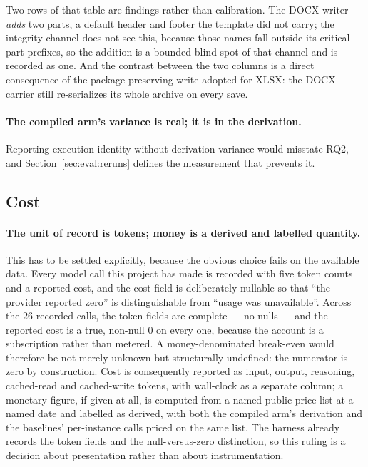Two rows of that table are findings rather than calibration. The DOCX writer \emph{adds} two
parts, a default header and footer the template did not carry; the integrity channel does not
see this, because those names fall outside its critical-part prefixes, so the addition is a
bounded blind spot of that channel and is recorded as one. And the contrast between the two
columns is a direct consequence of the package-preserving write adopted for XLSX: the DOCX
carrier still re-serializes its whole archive on every save.

\paragraph{The compiled arm's variance is real; it is in the derivation.}
Reporting execution identity without derivation variance would misstate RQ2, and
Section~\ref{sec:eval:reruns} defines the measurement that prevents it.

\subsection{Cost}
\label{sec:eval:cost}

\paragraph{The unit of record is tokens; money is a derived and labelled quantity.}
This has to be settled explicitly, because the obvious choice fails on the available data.
Every model call this project has made is recorded with five token counts and a reported
cost, and the cost field is deliberately nullable so that ``the provider reported zero'' is
distinguishable from ``usage was unavailable''. Across the $26$ recorded calls, the token
fields are complete --- no nulls --- and the reported cost is a true, non-null $0$ on every
one, because the account is a subscription rather than metered. A money-denominated
break-even would therefore be not merely unknown but structurally undefined: the numerator is
zero by construction. Cost is consequently reported as input, output, reasoning, cached-read
and cached-write tokens, with wall-clock as a separate column; a monetary figure, if given at
all, is computed from a named public price list at a named date and labelled as derived, with
both the compiled arm's derivation and the baselines' per-instance calls priced on the same
list. The harness already records the token fields and the null-versus-zero distinction, so
this ruling is a decision about presentation rather than about instrumentation.

